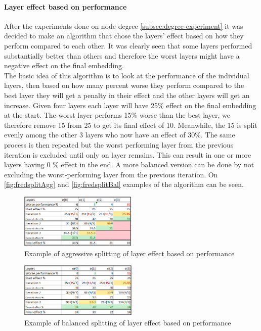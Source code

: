 \paragraph{Layer effect based on performance} \label{fredsplit}
After the experiments done on node degree \autoref{subsec:degree-experiment} it was decided to make an algorithm that chose the layers' effect based on how they perform compared to each other.
It was clearly seen that some layers performed substantially better than others and therefore the worst layers might have a negative effect on the final embedding.
\\
The basic idea of this algorithm is to look at the performance of the individual layers, then based on how many percent worse they perform compared to the best layer they will get a penalty in their effect and the other layers will get an increase.
Given four layers each layer will have 25\% effect on the final embedding at the start.
The worst layer performs 15\% worse than the best layer, we therefore remove 15 from 25 to get its final effect of 10.
Meanwhile, the 15 is split evenly among the other 3 layers who now have an effect of 30\%.
The same process is then repeated but the worst performing layer from the previous iteration is excluded until only on layer remains.
This can result in one or more layers having 0 \% effect in the end.
A more balanced version can be done by not excluding the worst-performing layer from the previous iteration.
On \autoref{fig:fredsplitAgg} and \autoref{fig:fredsplitBal} examples of the algorithm can be seen.

\begin{figure}
    \includegraphics[width=0.5\textwidth]{figures/fredsplit/aggresiveAlgo.png}
    \centering
    \caption{Example of aggressive splitting of layer effect based on performance}
    \label{fig:fredsplitAgg}
\end{figure}
\begin{figure}
    \includegraphics[width=0.5\textwidth]{figures/fredsplit/balancedAlgo.png}
    \centering
    \caption{Example of balanced splitting of layer effect based on performance}
    \label{fig:fredsplitBal}
\end{figure}

